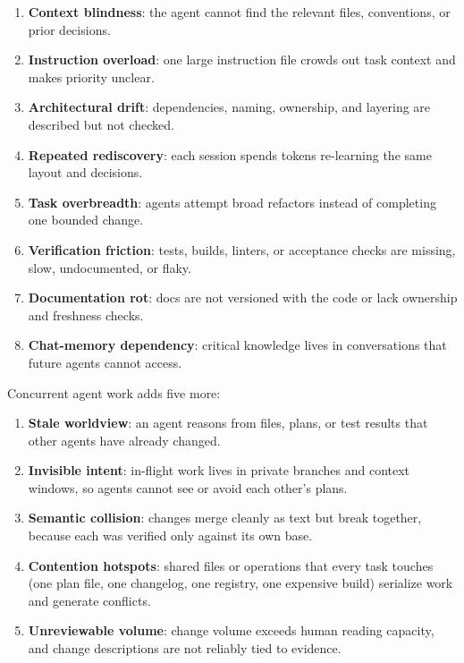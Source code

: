 \documentclass[11pt]{article}
\begin{document}
\begin{enumerate}[leftmargin=*]
  \item \textbf{Context blindness}: the agent cannot find the relevant files, conventions, or prior decisions.
  \item \textbf{Instruction overload}: one large instruction file crowds out task context and makes priority unclear.
  \item \textbf{Architectural drift}: dependencies, naming, ownership, and layering are described but not checked.
  \item \textbf{Repeated rediscovery}: each session spends tokens re-learning the same layout and decisions.
  \item \textbf{Task overbreadth}: agents attempt broad refactors instead of completing one bounded change.
  \item \textbf{Verification friction}: tests, builds, linters, or acceptance checks are missing, slow, undocumented, or flaky.
  \item \textbf{Documentation rot}: docs are not versioned with the code or lack ownership and freshness checks.
  \item \textbf{Chat-memory dependency}: critical knowledge lives in conversations that future agents cannot access.
\end{enumerate}

Concurrent agent work adds five more:

\begin{enumerate}[leftmargin=*,resume]
  \item \textbf{Stale worldview}: an agent reasons from files, plans, or test results that other agents have already changed.
  \item \textbf{Invisible intent}: in-flight work lives in private branches and context windows, so agents cannot see or avoid each other's plans.
  \item \textbf{Semantic collision}: changes merge cleanly as text but break together, because each was verified only against its own base.
  \item \textbf{Contention hotspots}: shared files or operations that every task touches (one plan file, one changelog, one registry, one expensive build) serialize work and generate conflicts.
  \item \textbf{Unreviewable volume}: change volume exceeds human reading capacity, and change descriptions are not reliably tied to evidence.
\end{enumerate}
\end{document}
